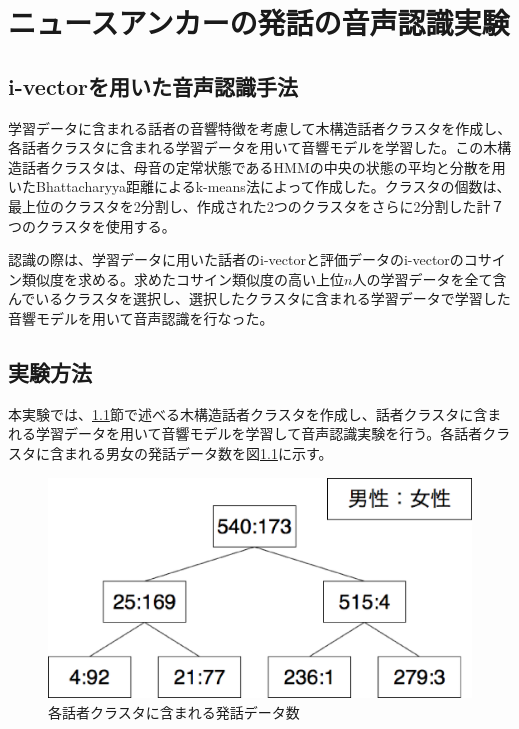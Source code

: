\chapter{ニュースアンカーの発話の音声認識実験}
\label{chapter:speech_recog}


\section{i-vectorを用いた音声認識手法\cite{yoshimura_clustering}}
\label{section:yoshimura_pre_clustering}
学習データに含まれる話者の音響特徴を考慮して木構造話者クラスタを作成し、各話者クラスタに含まれる学習データを用いて音響モデルを学習した。この木構造話者クラスタは、母音の定常状態であるHMMの中央の状態の平均と分散を用いたBhattacharyya距離によるk-means法によって作成した。クラスタの個数は、最上位のクラスタを2分割し、作成された2つのクラスタをさらに2分割した計７つのクラスタを使用する。\par
認識の際は、学習データに用いた話者のi-vectorと評価データのi-vectorのコサイン類似度を求める。求めたコサイン類似度の高い上位$n$人の学習データを全て含んでいるクラスタを選択し、選択したクラスタに含まれる学習データで学習した音響モデルを用いて音声認識を行なった。\par

\section{実験方法}
本実験では、\ref{section:yoshimura_pre_clustering}節で述べる木構造話者クラスタを作成し、話者クラスタに含まれる学習データを用いて音響モデルを学習して音声認識実験を行う。各話者クラスタに含まれる男女の発話データ数を図\ref{fig:yoshimura_kikouzou}に示す。


\begin{figure}[H]
  \begin{center}
    \includegraphics[scale=0.5]{./figure/yoshimura.eps}
  \end{center}
  \caption{各話者クラスタに含まれる発話データ数 \label{fig:yoshimura_kikouzou}}
\end{figure}

